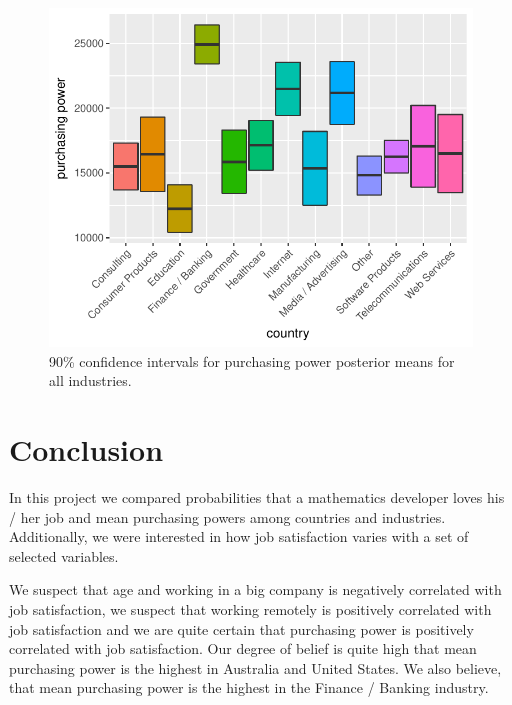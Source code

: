 \documentclass{article}
\begin{document}
\begin{figure}[H]
\centering
\includegraphics{report-046}
\caption{90\% confidence intervals for purchasing power posterior means for all industries.}\label{fig_14}
\end{figure}

\section{Conclusion}
In this project we compared probabilities that a mathematics developer loves his / her job and mean purchasing powers among countries and industries. Additionally, we were interested in how job satisfaction varies with a set of selected variables.

We suspect that age and working in a big company is negatively correlated with job satisfaction, we suspect that working remotely is positively correlated with job satisfaction and we are quite certain that purchasing power is positively correlated with job satisfaction. Our degree of belief is quite high that mean purchasing power is the highest in Australia and United States. We also believe, that mean purchasing power is the highest in the Finance / Banking industry.
\end{document}
